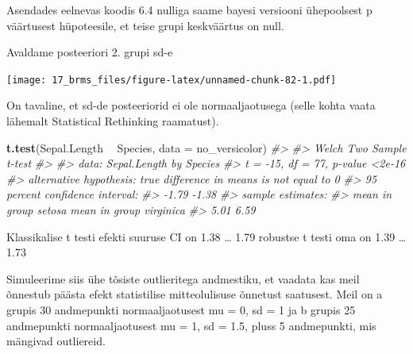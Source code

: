 \documentclass[]{book}
\newenvironment{Shaded}{\begin{snugshade}}{\end{snugshade}}
\newcommand{\KeywordTok}[1]{\textcolor[rgb]{0.13,0.29,0.53}{\textbf{#1}}}
\newcommand{\DataTypeTok}[1]{\textcolor[rgb]{0.13,0.29,0.53}{#1}}
\newcommand{\FloatTok}[1]{\textcolor[rgb]{0.00,0.00,0.81}{#1}}
\newcommand{\StringTok}[1]{\textcolor[rgb]{0.31,0.60,0.02}{#1}}
\newcommand{\CommentTok}[1]{\textcolor[rgb]{0.56,0.35,0.01}{\textit{#1}}}
\newcommand{\OtherTok}[1]{\textcolor[rgb]{0.56,0.35,0.01}{#1}}
\newcommand{\OperatorTok}[1]{\textcolor[rgb]{0.81,0.36,0.00}{\textbf{#1}}}
\newcommand{\NormalTok}[1]{#1}
\begin{document}
Asendades eelnevas koodis 6.4 nulliga saame bayesi versiooni ühepoolsest
p väärtusest hüpoteesile, et teise grupi keskväärtus on null.

Avaldame posteeriori 2. grupi sd-e

\begin{Shaded}
\end{Shaded}

\texttt{[image: 17\_brms\_files/figure-latex/unnamed-chunk-82-1.pdf]}

On tavaline, et sd-de posteeriorid ei ole normaaljaotusega (selle kohta
vaata lähemalt Statistical Rethinking raamatust).

\begin{Shaded}
\begin{Highlighting}[]
\KeywordTok{t.test}\NormalTok{(Sepal.Length }\OperatorTok{~}\StringTok{ }\NormalTok{Species, }\DataTypeTok{data =}\NormalTok{ no_versicolor)}
\CommentTok{#> }
\CommentTok{#>  Welch Two Sample t-test}
\CommentTok{#> }
\CommentTok{#> data:  Sepal.Length by Species}
\CommentTok{#> t = -15, df = 77, p-value <2e-16}
\CommentTok{#> alternative hypothesis: true difference in means is not equal to 0}
\CommentTok{#> 95 percent confidence interval:}
\CommentTok{#>  -1.79 -1.38}
\CommentTok{#> sample estimates:}
\CommentTok{#>    mean in group setosa mean in group virginica }
\CommentTok{#>                    5.01                    6.59}
\end{Highlighting}
\end{Shaded}

Klassikalise t testi efekti suuruse CI on 1.38 \ldots{} 1.79 robustse t
testi oma on 1.39 \ldots{} 1.73

Simuleerime siis ühe tõsiste outlieritega andmestiku, et vaadata kas
meil õnnestub päästa efekt statistilise mitteolulisuse õnnetust
saatusest. Meil on a grupis 30 andmepunkti normaaljaotusest mu = 0, sd =
1 ja b grupis 25 andmepunkti normaaljaotusest mu = 1, sd = 1.5, pluss 5
andmepunkti, mis mängivad outliereid.
\end{document}
